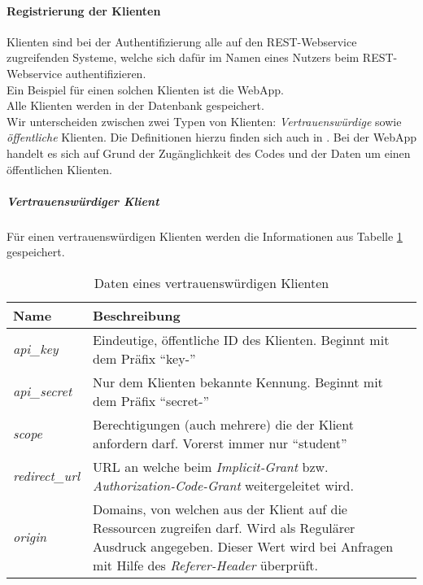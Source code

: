 \paragraph{Registrierung der Klienten}
Klienten sind bei der Authentifizierung alle auf den REST-Webservice zugreifenden Systeme, welche sich dafür im Namen eines Nutzers beim REST-Webservice authentifizieren.\\
Ein Beispiel für einen solchen Klienten ist die WebApp.\\
Alle Klienten werden in der Datenbank gespeichert.\\
Wir unterscheiden zwischen zwei Typen von Klienten: \textit{Vertrauenswürdige} sowie \textit{öffentliche} Klienten. Die Definitionen hierzu finden sich auch in \cite[Kap. 2.1]{rfc6749}. Bei der WebApp handelt es sich auf Grund der Zugänglichkeit des Codes und der Daten um einen öffentlichen Klienten.
\subparagraph{Vertrauenswürdiger Klient}
Für einen vertrauenswürdigen Klienten werden die Informationen aus Tabelle \ref{tab:api-auth-confidential-client-data} gespeichert.\\
\begin{table}
	\begin{tabularx}{\textwidth}{@{} | X | X | @{}}
		\hline
		\textbf{Name} & \textbf{Beschreibung}\\ \hline \hline
		\textit{api\_key} & Eindeutige, öffentliche ID des Klienten. Beginnt mit dem Präfix \enquote{key-} \\ \hline
		\textit{api\_secret} & Nur dem Klienten bekannte Kennung. Beginnt mit dem Präfix \enquote{secret-} \\ \hline
		\textit{scope} & Berechtigungen (auch mehrere) die der Klient anfordern darf. Vorerst immer nur \enquote{student} \\ \hline
		\textit{redirect\_url} & URL an welche beim \textit{Implicit-Grant} bzw. \textit{Authorization-Code-Grant} weitergeleitet wird. \\ \hline
		\textit{origin} & Domains, von welchen aus der Klient auf die Ressourcen zugreifen darf. Wird als Regulärer Ausdruck angegeben. Dieser Wert wird bei Anfragen mit Hilfe des \textit{Referer-Header} überprüft. \\
		\hline
	\end{tabularx}
\caption{Daten eines vertrauenswürdigen Klienten}
\label{tab:api-auth-confidential-client-data}
\end{table}

